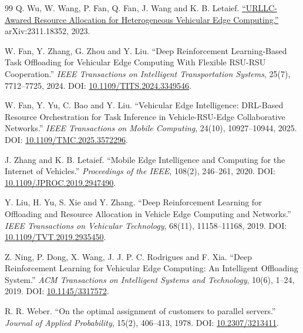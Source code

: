 \documentclass[12pt,a4paper]{article}
\begin{document}
\begin{thebibliography}{99}
 Q. Wu, W. Wang, P. Fan, Q. Fan, J. Wang and K. B. Letaief. \href{\detokenize{https://arxiv.org/abs/2311.18352}}{``URLLC-Awared Resource Allocation for Heterogeneous Vehicular Edge Computing.''} arXiv:2311.18352, 2023.

 W. Fan, Y. Zhang, G. Zhou and Y. Liu. ``Deep Reinforcement Learning-Based Task Offloading for Vehicular Edge Computing With Flexible RSU-RSU Cooperation.'' \emph{IEEE Transactions on Intelligent Transportation Systems}, 25(7), 7712--7725, 2024. DOI: \href{\detokenize{https://doi.org/10.1109/TITS.2024.3349546}}{10.1109/TITS.2024.3349546}.

 W. Fan, Y. Yu, C. Bao and Y. Liu. ``Vehicular Edge Intelligence: DRL-Based Resource Orchestration for Task Inference in Vehicle-RSU-Edge Collaborative Networks.'' \emph{IEEE Transactions on Mobile Computing}, 24(10), 10927--10944, 2025. DOI: \href{\detokenize{https://doi.org/10.1109/TMC.2025.3572296}}{10.1109/TMC.2025.3572296}.

 J. Zhang and K. B. Letaief. ``Mobile Edge Intelligence and Computing for the Internet of Vehicles.'' \emph{Proceedings of the IEEE}, 108(2), 246--261, 2020. DOI: \href{\detokenize{https://doi.org/10.1109/JPROC.2019.2947490}}{10.1109/JPROC.2019.2947490}.

 Y. Liu, H. Yu, S. Xie and Y. Zhang. ``Deep Reinforcement Learning for Offloading and Resource Allocation in Vehicle Edge Computing and Networks.'' \emph{IEEE Transactions on Vehicular Technology}, 68(11), 11158--11168, 2019. DOI: \href{\detokenize{https://doi.org/10.1109/TVT.2019.2935450}}{10.1109/TVT.2019.2935450}.

 Z. Ning, P. Dong, X. Wang, J. J. P. C. Rodrigues and F. Xia. ``Deep Reinforcement Learning for Vehicular Edge Computing: An Intelligent Offloading System.'' \emph{ACM Transactions on Intelligent Systems and Technology}, 10(6), 1--24, 2019. DOI: \href{\detokenize{https://doi.org/10.1145/3317572}}{10.1145/3317572}.

 R. R. Weber. ``On the optimal assignment of customers to parallel servers.'' \emph{Journal of Applied Probability}, 15(2), 406--413, 1978. DOI: \href{\detokenize{https://doi.org/10.2307/3213411}}{10.2307/3213411}.


\end{thebibliography}
\end{document}
